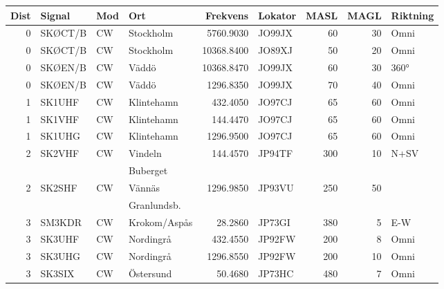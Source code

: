 \scriptsize

\begin{longtable}{rlllrlrrl}
\bf Dist & \bf Signal & \bf Mod  & \bf Ort      & \bf Frekvens & \bf Lokator & \bf MASL & \bf MAGL & \bf Riktning \\ \hline
0        & SKØCT/B    & CW       & Stockholm    & 5760.9030    & JO99JX      & 60       & 30       & Omni         \\
0        & SKØCT/B    & CW       & Stockholm    & 10368.8400   & JO89XJ      & 50       & 20       & Omni         \\
0        & SKØEN/B    & CW       & Väddö        & 10368.8470   & JO99JX      & 60       & 30       & 360°         \\
0        & SKØEN/B    & CW       & Väddö        & 1296.8350    & JO99JX      & 70       & 40       & Omni         \\
1        & SK1UHF     & CW       & Klintehamn   & 432.4050     & JO97CJ      & 65       & 60       & Omni         \\
1        & SK1VHF     & CW       & Klintehamn   & 144.4470     & JO97CJ      & 65       & 60       & Omni         \\
1        & SK1UHG     & CW       & Klintehamn   & 1296.9500    & JO97CJ      & 65       & 60       & Omni         \\
2        & SK2VHF     & CW       & Vindeln      & 144.4570     & JP94TF      & 300      & 10       & N+SV         \\
         &            &          & Buberget     &              &             &          &          &              \\
2        & SK2SHF     & CW       & Vännäs       & 1296.9850    & JP93VU      & 250      & 50       &              \\
         &            &          & Granlundsb.  &              &             &          &          &              \\
3        & SM3KDR     & CW       & Krokom/Aspås & 28.2860      & JP73GI      & 380      & 5        & E-W          \\
3        & SK3UHF     & CW       & Nordingrå    & 432.4550     & JP92FW      & 200      & 8        & Omni         \\
3        & SK3UHG     & CW       & Nordingrå    & 1296.8550    & JP92FW      & 200      & 10       & Omni         \\
3        & SK3SIX     & CW       & Östersund    & 50.4680      & JP73HC      & 480      & 7        & Omni         \\

\end{longtable}
